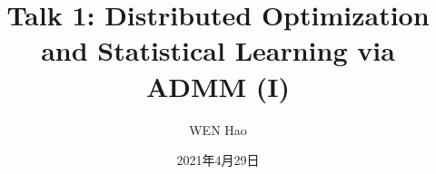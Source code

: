 \usepackage{empheq}
\usepackage{cancel}




\title[Boyd\\Distributed ADMM]{Talk 1: Distributed Optimization and Statistical Learning via ADMM (I)}
\date{2021年4月29日}
\author[]{WEN Hao}




\setlength{\belowdisplayskip}{5pt} \setlength{\belowdisplayshortskip}{5pt}
\setlength{\abovedisplayskip}{5pt} \setlength{\abovedisplayshortskip}{5pt}


\begin{frame}
\titlepage %
\end{frame}


\begin{frame}
\tableofcontents %
\end{frame}


